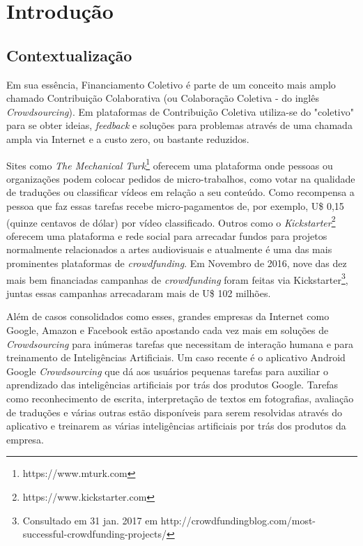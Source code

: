\chapter{Introdução}

\section{Contextualização}
Em sua essência, Financiamento Coletivo é parte de um conceito mais amplo chamado Contribuição Colaborativa (ou Colaboração Coletiva - do inglês \emph{Crowdsourcing}). Em plataformas de Contribuição Coletiva utiliza-se do "coletivo" para se obter ideias, \emph{feedback} e soluções para problemas através de uma chamada ampla via Internet e a custo zero, ou bastante reduzidos.

Sites como \emph{The Mechanical Turk}\footnote{https://www.mturk.com} oferecem uma plataforma onde pessoas ou organizações podem colocar pedidos de micro-trabalhos, como votar na qualidade de traduções ou classificar vídeos em relação a seu conteúdo. Como recompensa a pessoa que faz essas tarefas recebe micro-pagamentos de, por exemplo, U\$ 0,15 (quinze centavos de dólar) por vídeo classificado. Outros como o \emph{Kickstarter}\footnote{https://www.kickstarter.com} oferecem uma plataforma e rede social para arrecadar fundos para projetos normalmente relacionados a artes audiovisuais e atualmente é uma das mais prominentes plataformas de \emph{crowdfunding}. Em Novembro de 2016, nove das dez mais bem financiadas campanhas de \emph{crowdfunding} foram feitas via Kickstarter\footnote{Consultado em 31 jan. 2017 em http://crowdfundingblog.com/most-successful-crowdfunding-projects/}, juntas essas campanhas arrecadaram mais de U\$ 102 milhões.

Além de casos consolidados como esses, grandes empresas da Internet como Google, Amazon e Facebook estão apostando cada vez mais em soluções de \emph{Crowdsourcing} para inúmeras tarefas que necessitam de interação humana e para treinamento de Inteligências Artificiais. Um caso recente é o aplicativo Android Google \emph{Crowdsourcing} \cite{cnet-google-crowdsourcing} que dá aos usuários pequenas tarefas para auxiliar o aprendizado das inteligências artificiais por trás dos produtos Google. Tarefas como reconhecimento de escrita, interpretação de textos em fotografias, avaliação de traduções e várias outras estão disponíveis para serem resolvidas através do aplicativo e treinarem as várias inteligências artificiais por trás dos produtos da empresa.

